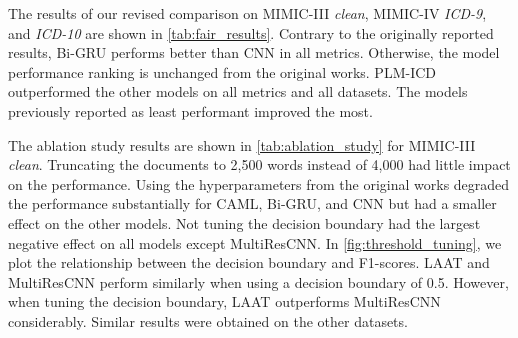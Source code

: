 {The results of our revised comparison on MIMIC-III \textit{clean}, MIMIC-IV \textit{ICD-9}, and \textit{ICD-10} are shown in \cref{tab:fair_results}. Contrary to the originally reported results, Bi-GRU performs better than CNN in all metrics. Otherwise, the model performance ranking is unchanged from the original works. PLM-ICD outperformed the other models on all metrics and all datasets. The models previously reported as least performant improved the most. 

The ablation study results are shown in \cref{tab:ablation_study} for MIMIC-III \textit{clean}. Truncating the documents to 2,500 words instead of 4,000 had little impact on the performance. Using the hyperparameters from the original works degraded the performance substantially for CAML, Bi-GRU, and CNN but had a smaller effect on the other models. Not tuning the decision boundary had the largest negative effect on all models except MultiResCNN. In \cref{fig:threshold_tuning}, we plot the relationship between the decision boundary and F1-scores. LAAT and MultiResCNN perform similarly when using a decision boundary of 0.5. However, when tuning the decision boundary, LAAT outperforms MultiResCNN considerably.
Similar results were obtained on the other datasets. 

\begin{sidewaystable}
    \centering
    \caption[Ablation study on MIMIC-III \textit{clean}.]{Ablation study on MIMIC-III \textit{clean}. The numbers are the micro/macro F1-scores on the test set.}
    \label{tab:ablation_study}
\end{sidewaystable}


}
